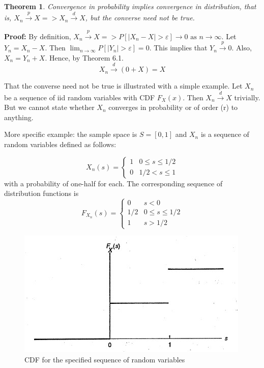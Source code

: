 \documentclass{article}
\newtheorem{theorem}{Theorem}[section]
\begin{document}
\begin{theorem}
    Convergence in probability implies convergence in distribution, that is, \(X_n \stackrel{p} \longrightarrow X => X_n \stackrel{d} \longrightarrow X\), but the converse need not be true.
\end{theorem}

\textbf{Proof:} By definition, \(X_n \stackrel{p} \longrightarrow X => P[|X_n-X|>\varepsilon]\rightarrow 0 \text{ as } n \rightarrow \infty\). Let \(Y_n=X_n-X\). Then \(\lim_{n \rightarrow \infty} P[|Y_n|>\varepsilon]=0\). This implies that \(Y_n \stackrel{p} \longrightarrow 0\). Also, \(X_n=Y_n+X\). Hence, by Theorem 6.1.
\begin{equation*}
    X_n \stackrel{d} \longrightarrow (0+X)=X
\end{equation*}

That the converse need not be true is illustrated with a simple example. Let \(X_n\) be a sequence of iid random variables with CDF \(F_X(x)\). Then \(X_n \stackrel{d} \longrightarrow X\) trivially. But we cannot state whether \(X_n\) converges in probability or of order (r) to anything.

More specific example: the sample space is \(S=[0,1]\) and \(X_n\) is a sequence of random variables defined as follows:

\begin{equation*}
    X_n(s)=\left\{
    \begin{array}{ll}
        1 & 0 \leq s \leq 1/2 \\
        0 &1/2<s\leq 1
    \end{array}
\right.
\end{equation*}
with a probability of one-half for each. The corresponding sequence of distribution functions is
\begin{equation*}
    F_{X_n}(s)=\left\{
    \begin{array}{ll}
        0 & s<0 \\
        1/2 & 0 \leq s \leq 1/2 \\
        1 & s>1/2
    \end{array}
\right.
\end{equation*}

\begin{figure} [H]
    \centering
    \includegraphics{pics/CDF of random variables.jpg}
    \caption{CDF for the specified sequence of random variables}
    \label{fig:enter-label289}
\end{figure}
\end{document}
